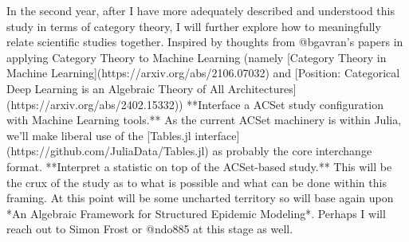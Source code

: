 \documentclass[11pt]{extarticle}
\begin{document}
In the second year, after I have more adequately described and understood this study in terms of category theory, I will further explore how to meaningfully relate scientific studies together.
Inspired by thoughts from @bgavran's papers in applying Category Theory to Machine Learning (namely [Category Theory in Machine Learning](https://arxiv.org/abs/2106.07032) and [Position: Categorical Deep Learning is an Algebraic Theory of All Architectures](https://arxiv.org/abs/2402.15332)) 
**Interface a ACSet study configuration with Machine Learning tools.** As the current ACSet machinery is within Julia, we'll make liberal use of the [Tables.jl interface](https://github.com/JuliaData/Tables.jl) as probably the core interchange format.
**Interpret a statistic on top of the ACSet-based study.** This will be the crux of the study as to what is possible and what can be done within this framing. At this point will be some uncharted territory so will base again upon *An Algebraic Framework for Structured Epidemic Modeling*. Perhaps I will reach out to Simon Frost or @ndo885 at this stage as well.
\end{document}
